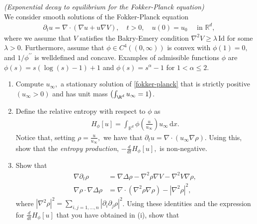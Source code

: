 
\begin{exercise}

\textit{(Exponential decay to equilibrium for the Fokker-Planck equation)} \\
We consider smooth solutions of the Fokker-Planck equation
\begin{align}\label{fokker-planck}
  \partial_{t} u=\nabla \cdot(\nabla u+u \nabla V), \quad t>0,
  \quad u(0)=u_{0} \quad \text { in } \mathbb{R}^{d},
\end{align}
where we assume that $V$ satisfies the Bakry-Emery condition
$\nabla^{2} V \geq \lambda \, \mathrm{Id}$ for some $\lambda>0$. Furthermore, assume that $\phi \in C^{4}((0, \infty))$ is convex with $\phi(1)=0,$ and $1 / \phi^{\prime \prime}$ is welldefined and concave. Examples of admissible functions $\phi$ are $\phi(s)=s(\log (s)-1)+1$ and $\phi(s)=s^{\alpha}-1$ for $1<\alpha \leq 2$.
\begin{enumerate}[label = (\roman*)]
  \item Compute $u_{\infty},$ a stationary solution of \eqref{fokker-planck} that is strictly positive
  $\left(u_{\infty}>0\right)$ and has unit mass $\left(\int_{\R^d} u_{\infty}=1\right)$.
  \item Define the relative entropy with respect to $\phi$ as
  \begin{align*}
    H_{\phi}[u]=\int_{\mathbb{R}^{d}} \phi\left(\frac{u}{u_{\infty}}\right) u_{\infty} \,\mathrm{d} x.
  \end{align*}
  Notice that, setting $\rho=\frac{u}{u_{\infty}},$ we have that
  $\partial_{t} u=\nabla \cdot\left(u_{\infty} \nabla \rho\right) .$
  Using this, show that the \textit{entropy production}, $-\frac{d}{d t} H_{\phi}[u],$ is non-negative.
  \item Show that
  \begin{align*}
    \nabla \partial_{t} \rho &= \nabla \Delta \rho-\nabla^{2} \rho \nabla V-\nabla^{2} V \nabla \rho, \\
    \nabla \rho \cdot \nabla \Delta \rho &= \nabla \cdot\left(\nabla^{2} \rho \nabla \rho\right)
    -\left|\nabla^{2} \rho\right|^{2},
  \end{align*}
  where $\left|\nabla^{2} \rho\right|^{2}=
  \sum_{i, j=1, \ldots, n}\left|\partial_{i} \partial_{j} \rho\right|^{2}$.
  Using these identities and the expression for $\frac{d}{d t} H_{\phi}[u]$
  that you have obtained in (i), show that
  \begin{align*}

\end{align*}
\end{enumerate}
\end{exercise}
